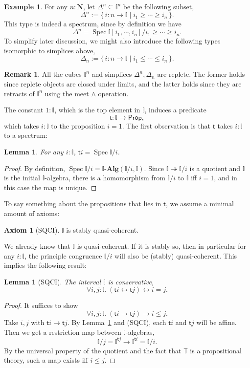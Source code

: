 \documentclass[12pt]{amsart}
\newtheorem{lemma}[theorem]{Lemma}
\theoremstyle{definition}
\newtheorem{example}[theorem]{Example}
\newtheorem{remark}[theorem]{Remark}
\newtheorem*{axiom}{Axiom}
\newcommand{\mb}[1]{\mathbf{#1}}
\newcommand{\mbb}[1]{\mathbb{#1}}
\newcommand{\T}{\mbb T}
\newcommand{\I}{\mbb I}
\newcommand{\ms}[1]{\mathsf{#1}}
\newcommand{\alg}{\text{-}\mb{Alg}}
\newcommand{\scomp}[2]{\{\,#1\mid#2\,\}}
\newcommand{\surj}{\twoheadrightarrow}
\newcommand{\N}{\mb N}
\newcommand{\fa}[2]{\forall #1\!\colon\!\!#2.\ }
\newcommand{\eq}{\leftrightarrow}
\newcommand{\pp}{\ms{Prop}}
\newcommand{\spec}{\operatorname{Spec}}
\begin{document}
\begin{example}\label{exm:simplicesaffine}
  For any $n : \N$, let $\Delta^n \subseteq \I^n$ be the following subset,
  \[ \Delta^n := \scomp{i : n \to \I}{i_1 \ge \cdots \ge i_n}. \]
  This type is indeed a spectrum, since by definition we have
  \[ \Delta^n = \spec\I[i_1,\cdots,i_n]/i_1\ge\cdots\ge i_n. \]
  To simplify later discussion, we might also introduce the following types isomorphic to simplices above,
  \[ \Delta_n := \scomp{i : n \to \I}{i_1 \le \cdots \le i_n}. \]
\end{example}

\begin{remark}
  All the cubes $\I^n$ and simplices $\Delta^n,\Delta_n$ are replete. The former holds since replete objects are closed under limits, and the latter holds since they are retracts of $\I^n$ using the meet $\wedge$ operation.
\end{remark}

The constant $1 : \I$, which is the top element in $\I$, induces a predicate
\[ \ms t : \I \to \pp, \]
which takes $i : \I$ to the proposition $i = 1$. The first observation is that $\ms t$ takes $i : \I$ to a spectrum:

\begin{lemma}\label{lem:openpropaffine}
  For any $i : \I$, $\ms ti = \spec \I/i$.
\end{lemma}
\begin{proof}
  By definition, $\spec \I/i = \I\alg(\I/i,\I)$. Since $\I \surj \I/i$ is a quotient and $\I$ is the initial $\I$-algebra, there is a homomorphism from $\I/i$ to $\I$ iff $i = 1$, and in this case the map is unique.
\end{proof}

To say something about the propositions that lies in $\ms t$, we assume a minimal amount of axioms:

\begin{axiom}[SQCI]
  $\I$ is stably quasi-coherent.
\end{axiom}

We already know that $\I$ is quasi-coherent. If it is stably so, then in particular for any $i : \I$, the principle congruence $\I/i$ will also be (stably) quasi-coherent. This implies the following result:

\begin{lemma}[SQCI]\label{lem:intconserve}
  The interval $\I$ is conservative,
  \[ \fa{i,j}{\I} (\ms ti \eq \ms tj) \eq i = j. \]
\end{lemma}
\begin{proof}
  It suffices to show
  \[ \fa{i,j}{\I}(\ms ti \to \ms tj) \to i \le j. \]
  Take $i,j$ with $\ms ti \to \ms tj$. By Lemma~\ref{lem:openpropaffine} and (SQCI), each $\ms ti$ and $\ms tj$ will be affine. Then we get a restriction map between $\I$-algebras,
  \[ \I/j = \I^{\ms tj} \to \I^{\ms ti} = \I/i. \]
  By the universal property of the quotient and the fact that $\T$ is a propositional theory, such a map exists iff $i \le j$.
\end{proof}
\end{document}
